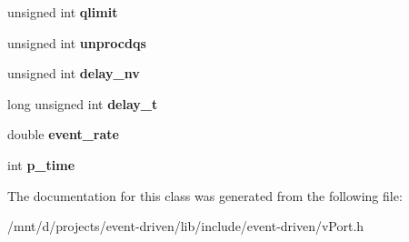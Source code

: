 \begin{DoxyCompactItemize}
$$unsigned int {\bfseries qlimit}
\item 
\mbox{\label{classev_1_1vReadPort_acdcf63464771194e87d0fdd8226361a0}} 
unsigned int {\bfseries unprocdqs}
\item 
\mbox{\label{classev_1_1vReadPort_af6ce0d204c3fc755b32a31cdcc3b55b0}} 
unsigned int {\bfseries delay\+\_\+nv}
\item 
\mbox{\label{classev_1_1vReadPort_a440488d899ba95a07ec610616ffc9cd2}} 
long unsigned int {\bfseries delay\+\_\+t}
\item 
\mbox{\label{classev_1_1vReadPort_a9888128c255eaf3cc2d528590b8bf12f}} 
double {\bfseries event\+\_\+rate}
\item 
\mbox{\label{classev_1_1vReadPort_a6c737cc37c6a88eeaf01c62d82c40d3a}} 
int {\bfseries p\+\_\+time}
\end{DoxyCompactItemize}


The documentation for this class was generated from the following file\+:\begin{DoxyCompactItemize}
\item 
/mnt/d/projects/event-\/driven/lib/include/event-\/driven/v\+Port.\+h\end{DoxyCompactItemize}
